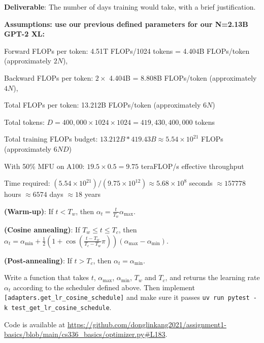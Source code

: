 \begin{enumerate}[label=(\alph*)]
    \textbf{Deliverable}: The number of days training would take, with a brief justification.

    \begin{answer}
    \textbf{Assumptions: use our previous defined parameters for our N=2.13B GPT-2 XL:}
    
    Forward FLOPs per token: 4.51T FLOPs/1024 tokens = 4.404B FLOPs/token (approximately $2N$), 

    Backward FLOPs per token: $2 \times$ 4.404B = 8.808B FLOPs/token (approximately $4N$),

    Total FLOPs per token: 13.212B FLOPs/token (approximately $6N$)

    Total tokens: $D = 400,000 \times 1024 \times 1024 = 419,430,400,000$ tokens

    Total training FLOPs budget: $13.212B * 419.43B \approx 5.54 \times 10^{21}$ FLOPs (approximately $6ND$)

    With 50\% MFU on A100: $19.5 \times 0.5 = 9.75$ teraFLOP/s effective throughput

    Time required: $(5.54 \times 10^{21}) / (9.75 \times 10^{12}) \approx 5.68 \times 10^{8}$ seconds $\approx 157778$ hours  $\approx 6574$ days $\approx 18$ years
    \end{answer}
\end{enumerate}


\textbf{(Warm-up)}: If $t < T_w$, then $\alpha_t = \frac{t}{T_w} \alpha_{\max}$.

\textbf{(Cosine annealing)}: If $T_w \leq t \leq T_c$, then $\alpha_t = \alpha_{\min} + \frac{1}{2}\left(1 + \cos\left(\frac{t - T_w}{T_c - T_w} \pi\right)\right)(\alpha_{\max} - \alpha_{\min})$.

\textbf{(Post-annealing)}: If $t > T_c$, then $\alpha_t = \alpha_{\min}$.

Write a function that takes $t$, $\alpha_{\max}$, $\alpha_{\min}$, $T_w$ and $T_c$, and returns the learning rate $\alpha_t$ according to the scheduler defined above. Then implement \texttt{[adapters.get\_lr\_cosine\_schedule]} and make sure it passes \texttt{uv run pytest -k test\_get\_lr\_cosine\_schedule}.

\begin{answer}
    Code is available at \url{https://github.com/donglinkang2021/assignment1-basics/blob/main/cs336_basics/optimizer.py#L183}.
\end{answer}

